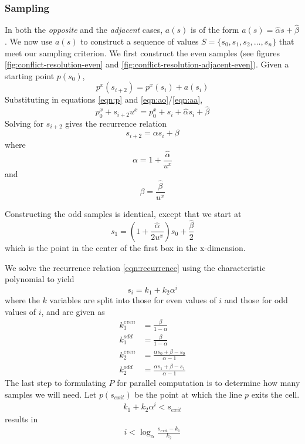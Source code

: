 \documentclass[final,3p,times,twocolumn]{elsarticle}
\begin{document}
\subsubsection{Sampling}
In both the \textit{opposite} and the \textit{adjacent} cases, $a(s)$ is of the form $a(s) = \hat{\alpha} s + \hat{\beta}$. We now use $a(s)$ to construct a sequence of values $S = \{s_0, s_1, s_2, \dots, s_n\}$ that meet our sampling criterion. We first construct the even samples (see figures \ref{fig:conflict-resolution-even} and \ref{fig:conflict-resolution-adjacent-even}). Given a starting point $p(s_0)$,
\begin{equation}
p^x(s_{i+2}) = p^x(s_i) + a(s_i)
\end{equation}
Substituting in equations \eqref{eqn:p} and \eqref{eqn:ao}/\eqref{eqn:aa},
\begin{equation}
p_0^x + s_{i+2}u^x = p_0^x + s_i + \hat{\alpha} s_i + \hat{\beta}
\end{equation}
Solving for $s_{i+2}$ gives the recurrence relation
\begin{equation}
s_{i+2} = \alpha s_i + \beta \label{eqn:recurrence}
\end{equation}
where
\begin{equation}
\alpha = 1 + \frac{\hat{\alpha}}{u^x}
\end{equation}
and
\begin{equation}
\beta = \frac{\hat{\beta}}{u^x}
\end{equation}

Constructing the odd samples is identical, except that we start at
\begin{equation}
s_1 = \left(1+\frac{\hat{\alpha}}{2u^x}\right)s_0 + \frac{\hat{\beta}}{2}
\end{equation}
which is the point in the center of the first box in the x-dimension.

We solve the recurrence relation \eqref{eqn:recurrence} using the characteristic polynomial to yield
\begin{equation}
s_i = k_1 + k_2 \alpha^i \label{eqn:sample}
\end{equation}
where the $k$ variables are split into those for even values of $i$ and those for odd values of $i$, and are given as
\begin{align}
k_1^{even} &= \frac{\beta}{1-\alpha} \\
k_1^{odd} &= \frac{\beta}{1-\alpha} \\
k_2^{even} &= \frac{\alpha s_0 + \beta - s_0}{\alpha-1} \\
k_2^{odd} &= \frac{\alpha s_1 + \beta - s_1}{\alpha-1}
\end{align}
The last step to formulating $P$ for parallel computation is to determine how many samples we will need. Let $p(s_{exit})$ be the point at which the line $p$ exits the cell.
\begin{align}
k_1+k_2\alpha^i < s_{exit}
\end{align}
results in
\begin{align}
i < \log_{\alpha}\frac{s_{exit}-k_1}{k_2} \label{eqn:num-samples}
\end{align}
\end{document}
